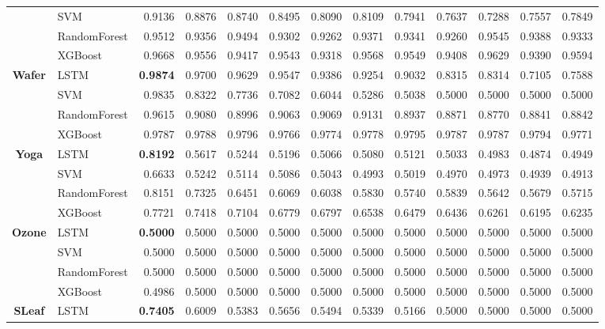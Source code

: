 \begin{table}[h]
\begin{adjustbox}{max width=15cm}
\begin{tabular}{|c|l|r|r|r|r|r|r|r|r|r|r|r|}
	& SVM &  0.9136 &  0.8876 &  0.8740 &  0.8495 &  0.8090 &  0.8109 &  0.7941 &  0.7637 &  0.7288 &  0.7557 &  0.7849 \\
	& RandomForest &  0.9512 &  0.9356 &  0.9494 &  0.9302 &  0.9262 &  0.9371 &  0.9341 &  0.9260 &  0.9545 &  0.9388 &  0.9333 \\
	& XGBoost &  0.9668 &  0.9556 &  0.9417 &  0.9543 &  0.9318 &  0.9568 &  0.9549 &  0.9408 &  0.9629 &  0.9390 &  0.9594 \\
	\hline
	\textbf{Wafer} & LSTM &  \textbf{0.9874} &  0.9700 &  0.9629 &  0.9547 &  0.9386 &  0.9254 &  0.9032 &  0.8315 &  0.8314 &  0.7105 &  0.7588 \\
	& SVM &  0.9835 &  0.8322 &  0.7736 &  0.7082 &  0.6044 &  0.5286 &  0.5038 &  0.5000 &  0.5000 &  0.5000 &  0.5000 \\
	& RandomForest &  0.9615 &  0.9080 &  0.8996 &  0.9063 &  0.9069 &  0.9131 &  0.8937 &  0.8871 &  0.8770 &  0.8841 &  0.8842 \\
	& XGBoost &  0.9787 &  0.9788 &  0.9796 &  0.9766 &  0.9774 &  0.9778 &  0.9795 &  0.9787 &  0.9787 &  0.9794 &  0.9771 \\
	\hline
	\textbf{Yoga} & LSTM &  \textbf{0.8192} &  0.5617 &  0.5244 &  0.5196 &  0.5066 &  0.5080 &  0.5121 &  0.5033 &  0.4983 &  0.4874 &  0.4949 \\
	& SVM &  0.6633 &  0.5242 &  0.5114 &  0.5086 &  0.5043 &  0.4993 &  0.5019 &  0.4970 &  0.4973 &  0.4939 &  0.4913 \\
	& RandomForest &  0.8151 &  0.7325 &  0.6451 &  0.6069 &  0.6038 &  0.5830 &  0.5740 &  0.5839 &  0.5642 &  0.5679 &  0.5715 \\
	& XGBoost &  0.7721 &  0.7418 &  0.7104 &  0.6779 &  0.6797 &  0.6538 &  0.6479 &  0.6436 &  0.6261 &  0.6195 &  0.6235 \\
	\hline
	\textbf{Ozone} & LSTM &  \textbf{0.5000} &  0.5000 &  0.5000 &  0.5000 &  0.5000 &  0.5000 &  0.5000 &  0.5000 &  0.5000 &  0.5000 &  0.5000 \\
	& SVM &  0.5000 &  0.5000 &  0.5000 &  0.5000 &  0.5000 &  0.5000 &  0.5000 &  0.5000 &  0.5000 &  0.5000 &  0.5000 \\
	& RandomForest &  0.5000 &  0.5000 &  0.5000 &  0.5000 &  0.5000 &  0.5000 &  0.5000 &  0.5000 &  0.5000 &  0.5000 &  0.5000 \\
	& XGBoost &  0.4986 &  0.5000 &  0.5000 &  0.5000 &  0.5000 &  0.5000 &  0.5000 &  0.5000 &  0.5000 &  0.5000 &  0.5000 \\
	\hline
	\textbf{SLeaf} & LSTM &  \textbf{0.7405} &  0.6009 &  0.5383 &  0.5656 &  0.5494 &  0.5339 &  0.5166 &  0.5000 &  0.5000 &  0.5000 &  0.5000 \\

\end{tabular}
\end{adjustbox}
\end{table}
